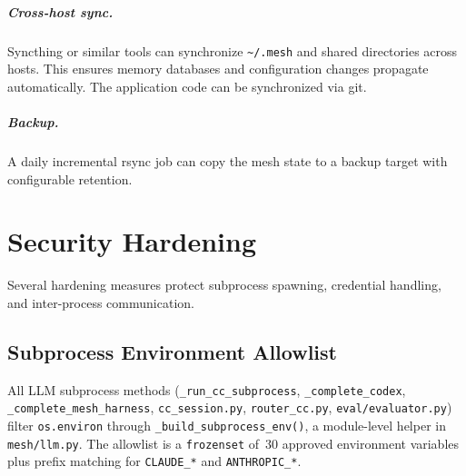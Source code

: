 \documentclass[11pt,letterpaper]{report}
\newcommand{\code}[1]{\texttt{#1}}
\begin{document}
\paragraph{Cross-host sync.}
Syncthing or similar tools can synchronize \code{\textasciitilde/.mesh}
and shared directories across hosts. This ensures memory databases
and configuration changes propagate automatically. The application code
can be synchronized via git.

\paragraph{Backup.}
A daily incremental rsync job can copy the mesh state to a backup target
with configurable retention.


\chapter{Security Hardening}
\label{ch:security}

Several hardening measures protect subprocess spawning, credential
handling, and inter-process communication.

\section{Subprocess Environment Allowlist}

All LLM subprocess methods (\code{\_run\_cc\_subprocess},
\code{\_complete\_codex}, \code{\_complete\_mesh\_harness},
\code{cc\_session.py}, \code{router\_cc.py}, \code{eval/evaluator.py})
filter \code{os.environ} through \code{\_build\_subprocess\_env()}, a
module-level helper in \code{mesh/llm.py}. The allowlist is a
\code{frozenset} of~30 approved environment variables plus prefix
matching for \code{CLAUDE\_*} and \code{ANTHROPIC\_*}.
\end{document}
